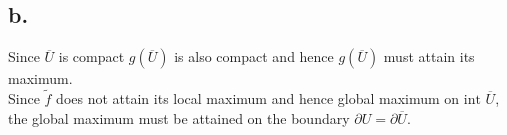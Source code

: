 \documentclass[11pt]{article}
\begin{document}
\subsection*{b.}
Since $\overline{U}$ is compact $g(\overline{U})$ is also compact and hence $g(\overline{U})$ must attain its maximum. \\
Since $\tilde{f}$ does not attain its local maximum and hence global maximum on $\text{int}$ $\overline{U}$, 
the global maximum must be attained on the boundary $\partial U = \partial \overline{U}$.  
\end{document}
